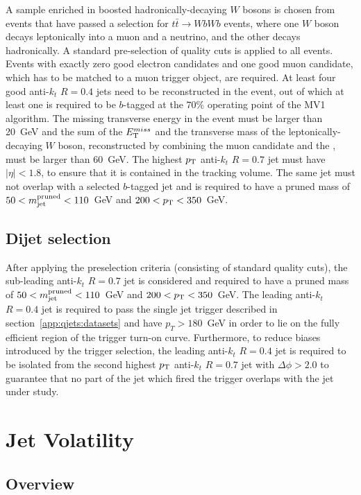 A sample enriched in boosted hadronically-decaying $W$ bosons is chosen from events that have passed a selection for $t\bar{t}\to WbWb$ events, where one $W$ boson decays leptonically into a muon and a neutrino, and the other decays hadronically. A standard pre-selection of quality cuts is applied to all events. Events with exactly zero good electron candidates and one good muon candidate, which has to be matched to a muon trigger object, are required. At least four good anti-$k_t$ $R=0.4$ jets need to be reconstructed in the event, out of which at least one is required to be $b$-tagged at the $70\%$ operating point of the MV1 algorithm. The missing transverse energy \Etmiss in the event must be larger than 20~GeV and the sum of the $E_{\rm T}^{miss}$ and the transverse mass of the leptonically-decaying $W$ boson, reconstructed by combining the muon candidate and the \Etmiss, must be larger than 60~GeV. The highest $p_{\rm T}$ anti-$k_t$ $R=0.7$ jet must have $|\eta|<1.8$, to ensure that it is contained in the tracking volume. The same jet must not overlap with a selected $b$-tagged jet and is required to have a pruned mass of $50<m_{\rm jet}^{\rm pruned}<110$~GeV and $200<p_{\rm T}<350$~GeV. 



\subsection{Dijet selection}


After applying the preselection criteria (consisting of standard quality cuts), the sub-leading anti-$k_t$ $R=0.7$ jet is considered and required to have a pruned mass of $50<m_{\rm jet}^{\rm pruned}<110$~GeV and $200<p_{\rm T}<350$~GeV. The leading anti-$k_t$ $R=0.4$ jet is required to pass the single jet trigger described in section~\ref{app:qjets:datasets} and have $p_T > 180$~GeV in order to lie on the fully efficient region of the trigger turn-on curve. Furthermore, to reduce biases introduced by the trigger selection, the leading anti-$k_t$ $R=0.4$ jet is required to be isolated from the second highest $p_{\rm T}$ anti-$k_t$ $R=0.7$ jet with $\Delta \phi > 2.0$ to guarantee that no part of the jet which fired the trigger overlaps with the jet under study.

\section{Jet Volatility}
\label{app:qjets:jetvol}

\subsection{Overview}
\label{app:qjets:jetvol:overview}

